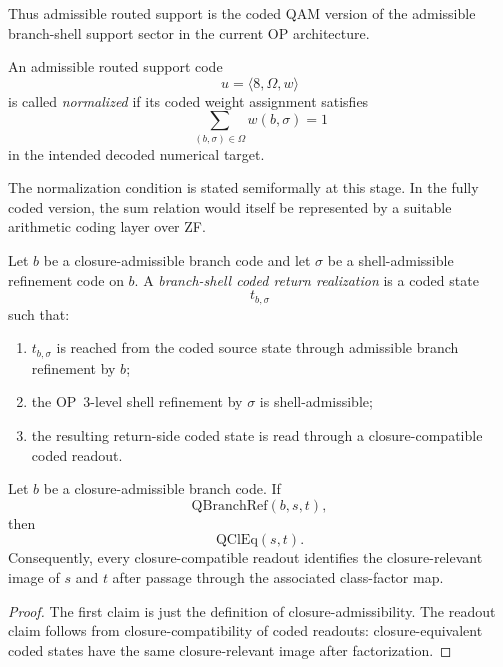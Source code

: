 \begin{remark}
Thus admissible routed support is the coded QAM version of the admissible branch-shell support sector in the current OP architecture.
\end{remark}

\begin{definition}
An admissible routed support code
\[
u=\langle 8,\Omega,w\rangle
\]
is called \emph{normalized} if its coded weight assignment satisfies
\[
\sum_{(b,\sigma)\in\Omega} w(b,\sigma)=1
\]
in the intended decoded numerical target.
\end{definition}

\begin{remark}
The normalization condition is stated semiformally at this stage. In the fully coded version, the sum relation would itself be represented by a suitable arithmetic coding layer over ZF.
\end{remark}

\begin{definition}
Let $b$ be a closure-admissible branch code and let $\sigma$ be a shell-admissible refinement code on $b$. A \emph{branch-shell coded return realization} is a coded state
\[
t_{b,\sigma}
\]
such that:
\begin{enumerate}
\item $t_{b,\sigma}$ is reached from the coded source state through admissible branch refinement by $b$;
\item the OP~3-level shell refinement by $\sigma$ is shell-admissible;
\item the resulting return-side coded state is read through a closure-compatible coded readout.
\end{enumerate}
\end{definition}

\begin{proposition}\label{prop:qam-branch-admissibility-principle}
Let $b$ be a closure-admissible branch code. If
\[
\mathrm{QBranchRef}(b,s,t),
\]
then
\[
\mathrm{QClEq}(s,t).
\]
Consequently, every closure-compatible readout identifies the closure-relevant image of $s$ and $t$ after passage through the associated class-factor map.
\end{proposition}

\begin{proof}
The first claim is just the definition of closure-admissibility. The readout claim follows from closure-compatibility of coded readouts: closure-equivalent coded states have the same closure-relevant image after factorization.
\end{proof}

